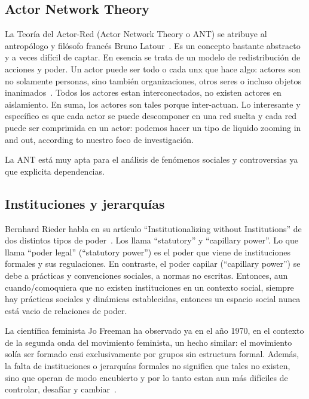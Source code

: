 \subsection{Actor Network Theory}

La Teoría del Actor-Red (Actor Network Theory o ANT) se atribuye al antropólogo y filósofo francés Bruno Latour~\autocite{Latour2010}.
Es un concepto bastante abstracto y a veces difícil de captar.
En esencia se trata de un modelo de redistribución de acciones y poder.
Un actor puede ser todo o cada unx que hace algo: actores son no solamente personas, sino también organizaciones, otros seres o incluso objetos inanimados~\autocite{Venturini2010b}.
Todos los actores estan interconectados, no existen actores en aislamiento.
En suma, los actores son tales porque inter-actuan.
Lo interesante y específico es que cada actor se puede descomponer en una red suelta y cada red puede ser comprimida en un actor:
podemos hacer un tipo de liquido zooming in and out, according to nuestro foco de investigación.

La ANT está muy apta para el análisis de fenómenos sociales y controversias ya que explicita dependencias.


\subsection{Instituciones y jerarquías}

Bernhard Rieder habla en su artículo ``Institutionalizing without Institutions'' de dos distintos tipos de poder~\autocite{Rieder2012}.
Los llama ``statutory'' y ``capillary power''.
Lo que llama ``poder legal'' (``statutory power'') es el poder que viene de instituciones formales y sus regulaciones.
En contraste, el poder capilar (``capillary power'') se debe a prácticas y convenciones sociales, a normas no escritas.
Entonces, aun cuando/comoquiera que no existen instituciones en un contexto social, siempre hay prácticas sociales y dinámicas establecidas, entonces un espacio social nunca está vacio de relaciones de poder.

La científica feminista Jo Freeman ha observado ya en el año 1970, en el contexto de la segunda onda del movimiento feminista, un hecho similar:
el movimiento solía ser formado casi exclusivamente por grupos sin estructura formal.
Además, la falta de instituciones o jerarquías formales no significa que tales no existen, sino que operan de modo encubierto y por lo tanto estan aun más difíciles de controlar, desafíar y cambiar~\autocite{Freeman1970}.

